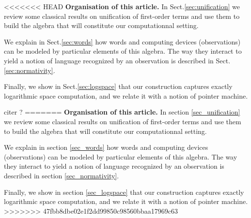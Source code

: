 

\smallskip\noindent
<<<<<<< HEAD
\textbf{Organisation of this article.} In Sect.\ref{sec:unification} we review some classical results on unification of first-order terms and use them to build the algebra that will constitute our computationnal setting.

We explain in Sect.\ref{sec:words} how words and computing devices (observations) can be modeled by particular elements of this algebra.
The way they interact to yield a notion of language recognized by an observation is described in Sect.\ref{sec:normativity}.

Finally, we show in Sect.\ref{sec:logspace} that our construction captures exactly logarithmic space computation, and we relate it with a notion of pointer machine.

citer \cite{girard_three_lightings} ?
=======
\textbf{Organisation of this article.} In section \ref{sec_unification} we review some classical results on unification of first-order terms and use them to build the algebra that will constitute our computationnal setting.

We explain in section \ref{sec_words} how words and computing devices (observations) can be modeled by particular elements of this algebra. The way they interact to yield a notion of language recognized by an observation is described in section \ref{sec_normativity}.

Finally, we show in section \ref{sec_logspace} that our construction captures exactly logarithmic space computation, and we relate it with a notion of pointer machine.
>>>>>>> 47fbb8dbe02e1f2dd99850c98560bbaa17969c63
